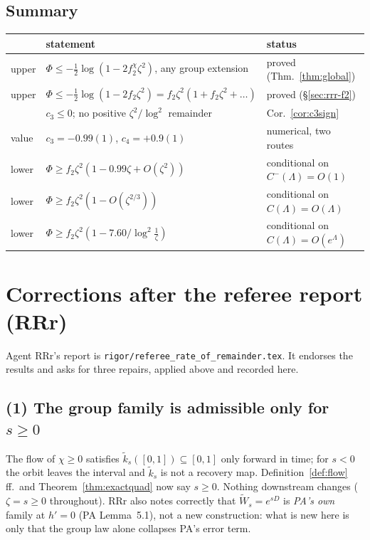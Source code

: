 \documentclass[11pt]{article}
\newcommand{\Wt}{\widetilde W}
\newcommand{\kt}{\widetilde k}
\begin{document}
\subsection{Summary}
\begin{center}\small
\begin{tabular}{lll}\toprule
& statement & status\\\midrule
upper & $\Phi\le-\frac12\log(1-2f_2^\chi\zeta^2)$, any group extension & proved
 (Thm.~\ref{thm:global})\\
upper & $\Phi\le-\frac12\log(1-2f_2\zeta^2)=f_2\zeta^2(1+f_2\zeta^2+\dots)$ & proved
 (\S\ref{sec:rrr-f2})\\
 & $c_3\le0$; no positive $\zeta^2/\log^2$ remainder & Cor.~\ref{cor:c3sign}\\
value & $c_3=-0.99(1)$, $c_4=+0.9(1)$ & numerical, two routes\\
lower & $\Phi\ge f_2\zeta^2(1-0.99\zeta+O(\zeta^2))$ & conditional on
 $C^-(\Lambda)=O(1)$\\
lower & $\Phi\ge f_2\zeta^2(1-O(\zeta^{2/3}))$ & conditional on $C(\Lambda)=O(\Lambda)$\\
lower & $\Phi\ge f_2\zeta^2(1-7.60/\log^2\frac1\zeta)$ & conditional on $C(\Lambda)=O(e^\Lambda)$\\
\bottomrule\end{tabular}\end{center}

\section{Corrections after the referee report (RRr)}\label{sec:rrr}

Agent RRr's report is \texttt{rigor/referee\_rate\_of\_remainder.tex}.  It endorses the results and
asks for three repairs, applied above and recorded here.

\subsection{(1) The group family is admissible only for $s\ge0$}
The flow of $\chi\ge0$ satisfies $\kt_s([0,1])\subseteq[0,1]$ only forward in time; for $s<0$ the
orbit leaves the interval and $\kt_s$ is not a recovery map.  Definition~\ref{def:flow} ff.\ and
Theorem~\ref{thm:exactquad} now say $s\ge0$.  Nothing downstream changes ($\zeta=s\ge0$ throughout).
RRr also notes correctly that $\Wt_s=e^{sD}$ is \emph{PA's own} family at $h'=0$ (PA Lemma~5.1), not
a new construction: what is new here is only that the group law alone collapses PA's error term.
\end{document}
